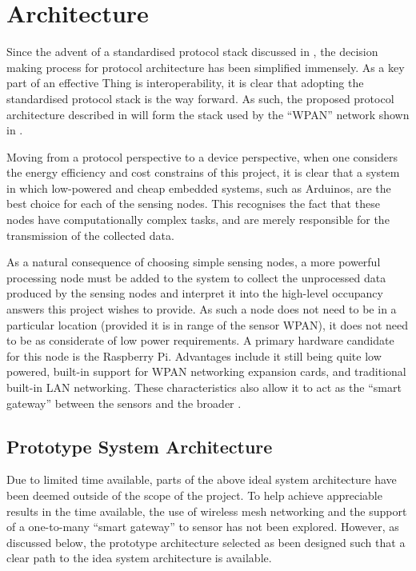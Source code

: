 \documentclass[../thesis/thesis.tex]{subfiles}
\begin{document}
\chapter{Architecture}

Since the advent of a standardised \iot protocol stack discussed in , the decision making process for protocol architecture has been simplified immensely. As a key part of an effective Thing is interoperability, it is clear that adopting the standardised protocol stack is the way forward. As such, the proposed protocol architecture described in  will form the stack used by the ``WPAN'' network shown in .

Moving from a protocol perspective to a device perspective, when one considers the energy efficiency and cost constrains of this project, it is clear that a system in which low-powered and cheap embedded systems, such as Arduinos, are the best choice for each of the sensing nodes. This recognises the fact that these nodes have computationally complex tasks, and are merely responsible for the transmission of the collected data.

As a natural consequence of choosing simple sensing nodes, a more powerful processing node must be added to the system to collect the unprocessed data produced by the sensing nodes and interpret it into the high-level occupancy answers this project wishes to provide. As such a node does not need to be in a particular location (provided it is in range of the sensor WPAN), it does not need to be as considerate of low power requirements. A primary hardware candidate for this node is the Raspberry Pi. Advantages include it still being quite low powered, built-in support for WPAN networking expansion cards, and traditional built-in LAN networking. These characteristics also allow it to act as the ``smart gateway'' between the sensors and the broader \iot.


\section{Prototype System Architecture}
Due to limited time available, parts of the above ideal system architecture have been deemed outside of the scope of the project. To help achieve appreciable results in the time available, the use of wireless mesh networking and the support of a one-to-many ``smart gateway'' to sensor has not been explored. However, as discussed below, the prototype architecture selected as been designed such that a clear path to the idea system architecture is available.
\end{document}
